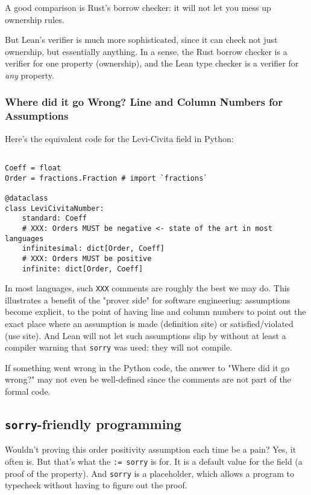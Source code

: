 \documentclass{article}
\begin{document}
A good comparison is Rust's borrow checker: it will not let you mess up ownership rules.

But Lean's verifier is much more sophisticated, since it can check not just ownership, but essentially anything. In a sense, the Rust borrow checker is a verifier for one property (ownership), and the Lean type checker is a verifier for \textit{any} property.

\subsubsection{Where did it go Wrong? Line and Column Numbers for Assumptions}

Here's the equivalent code for the Levi-Civita field in Python:

\begin{verbatim}

Coeff = float
Order = fractions.Fraction # import `fractions`

@dataclass
class LeviCivitaNumber:
    standard: Coeff
    # XXX: Orders MUST be negative <- state of the art in most languages
    infinitesimal: dict[Order, Coeff]
    # XXX: Orders MUST be positive
    infinite: dict[Order, Coeff]
\end{verbatim}

In most languages, such \texttt{XXX} comments are roughly the best we may do. This illustrates a benefit of the "prover side" for software engineering: assumptions become explicit, to the point of having line and column numbers to point out the exact place where an assumption is made (definition site) or satisfied/violated (use site). And Lean will not let such assumptions slip by without at least a compiler warning that \texttt{sorry} was used: they will not compile.

If something went wrong in the Python code, the answer to "Where did it go wrong?" may not even be well-defined since the comments are not part of the formal code.

\subsection{\texttt{sorry}-friendly programming}

Wouldn't proving this order positivity assumption each time be a pain? Yes, it often is. But that's what the \texttt{:= sorry} is for. It is a default value for the field (a proof of the property). And \texttt{sorry} is a placeholder, which allows a program to typecheck without having to figure out the proof.
\end{document}
